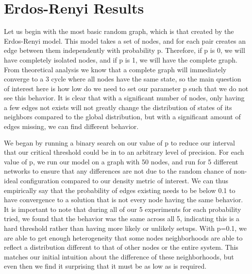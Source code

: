 \documentclass[letterpaper, 12 pt, conference]{ieeeconf}
\begin{document}
\section*{Erdos-Renyi Results}
Let us begin with the most basic random graph, which is that created by the Erdos-Renyi model. This model takes a set of nodes, and for each pair creates an edge between them independently with probability p. Therefore, if p is 0, we will have completely isolated nodes, and if p is 1, we will have the complete graph. From theoretical analysis we know that a complete graph will immediately converge to a 3 cycle where all nodes have the same state, so the main question of interest here is how low do we need to set our parameter p such that we do not see this behavior. It is clear that with a significant number of nodes, only having a few edges not exists will not greatly change the distribution of states of its neighbors compared to the global distribution, but with a significant amount of edges missing, we can find different behavior. 
\par
We began by running a binary search on our value of p to reduce our interval that our critical threshold could be in to an arbitrary level of precision. For each value of p, we run our model on a graph with 50 nodes, and run for 5 different networks to ensure that any differences are not due to the random chance of non-ideal configuration compared to our density metric of interest. We can thus empirically say that the probability of edges existing needs to be below 0.1 to have convergence to a solution that is not every node having the same behavior. It is important to note that during all of our 5 experiments for each probability tried, we found that the behavior was the same across all 5, indicating this is a hard threshold rather than having more likely or unlikely setups.  With p=0.1, we are able to get enough heterogeneity that some nodes neighborhoods are able to reflect a distribution different to that of other nodes or the entire system. This matches our initial intuition about the difference of these neighborhoods, but even then we find it surprising that it must be as low as is required. 
\end{document}
